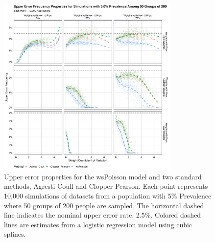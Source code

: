 \documentclass[AMA,STIX1COL]{WileyNJD-v2}
\begin{document}
\begin{figure}
\centering
\includegraphics[width=0.8\textwidth]{figures/perfect_upper_error_frequency_50_groups_0_05_prev.pdf}
\caption{Upper error properties for the wsPoisson model and two standard methods, Agresti-Coull and Clopper-Pearson.
Each point represents 10,000 simulations of datasets from a population with 5\% Prevalence where 50 groups of 200 people are sampled.
The horizontal dashed line indicates the nominal upper error rate, 2.5\%.
Colored dashed lines are estimates from a logistic regression model using cubic splines.}
\label{fig:perfect_upper_error_frequency_50_groups_0_05_prev}
\end{figure}
\end{document}
